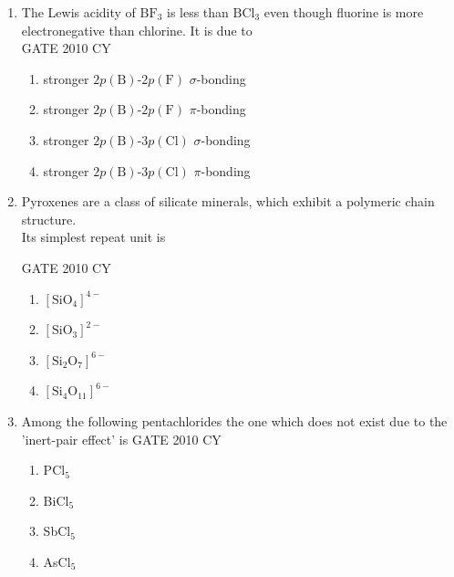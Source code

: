 \documentclass[journal,12pt,onecolumn]{IEEEtran}
\theoremstyle{remark}
\begin{document}
\begin{enumerate}
  
\item The Lewis acidity of \(\mathrm{BF_3}\) is less than \(\mathrm{BCl_3}\) even though fluorine is more electronegative than chlorine. It is due to\\

\hfill{GATE 2010 CY}
\begin{multicols}{2}
\begin{enumerate}
    \item stronger \(2p(\mathrm{B})\)-\(2p(\mathrm{F})\) \(\sigma\)-bonding
    \item stronger \(2p(\mathrm{B})\)-\(2p(\mathrm{F})\) \(\pi\)-bonding
    \item stronger \(2p(\mathrm{B})\)-\(3p(\mathrm{Cl})\) \(\sigma\)-bonding
    \item stronger \(2p(\mathrm{B})\)-\(3p(\mathrm{Cl})\) \(\pi\)-bonding
\end{enumerate}
\end{multicols}
\item Pyroxenes are a class of silicate minerals, which exhibit a polymeric chain structure.\\
Its simplest repeat unit is

\hfill{GATE 2010 CY}

\begin{multicols}{2}
\begin{enumerate}
    \item  $\mathrm{[SiO_4]^{4-}}$
    \item  $\mathrm{[SiO_3]^{2-}}$
    \item  $\mathrm{[Si_2O_7]^{6-}}$
    \item  $\mathrm{[Si_4O_{11}]^{6-}}$
\end{enumerate}
\end{multicols}
\item Among the following pentachlorides the one which does not exist due to the 'inert-pair effect' is
\hfill{GATE 2010 CY}
\begin{multicols}{2}
\begin{enumerate}
    \item PCl$_5$
    \item BiCl$_5$
    \item SbCl$_5$
    \item AsCl$_5$
\end{enumerate}
\end{multicols}


\end{enumerate}
\end{document}
